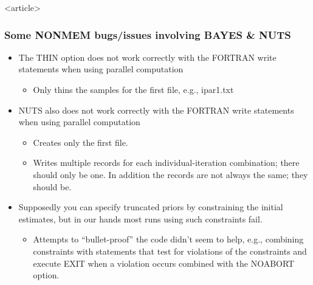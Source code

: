 \documentclass[handout]{beamer}
\begin{document}


  \begin{frame}<article>
    \frametitle{Some NONMEM bugs/issues involving BAYES \& NUTS}

    \begin{itemize}
    \item The THIN option does not work correctly with the FORTRAN
      write statements when using parallel computation
      \begin{itemize}
      \item Only thins the samples for the first file, e.g., ipar1.txt
      \end{itemize}
    \item NUTS also does not work correctly with the FORTRAN write
      statements when using parallel computation
      \begin{itemize}
      \item Creates only the first file.
      \item Writes multiple records for each individual-iteration
        combination; there should only be one. In addition the records
        are not always the same; they should be.
      \end{itemize}
    \item Supposedly you can specify truncated priors by constraining
      the initial estimates, but in our hands most runs using such
      constraints fail.
      \begin{itemize}
        \item Attempts to ``bullet-proof'' the code didn't seem to help,
        e.g., combining constraints with statements that test for
        violations of the constraints and execute EXIT when a
        violation occurs combined with the NOABORT option.
      \end{itemize}
    \end{itemize}
    
  \end{frame}
\end{document}
